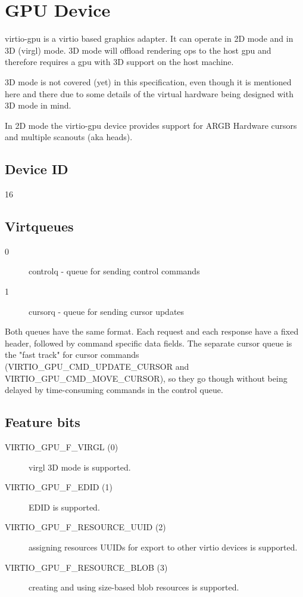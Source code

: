 \section{GPU Device}\label{sec:Device Types / GPU Device}

virtio-gpu is a virtio based graphics adapter.  It can operate in 2D
mode and in 3D (virgl) mode.  3D mode will offload rendering ops to
the host gpu and therefore requires a gpu with 3D support on the host
machine.

3D mode is not covered (yet) in this specification, even though it is
mentioned here and there due to some details of the virtual hardware
being designed with 3D mode in mind.

In 2D mode the virtio-gpu device provides support for ARGB Hardware
cursors and multiple scanouts (aka heads).

\subsection{Device ID}\label{sec:Device Types / GPU Device / Device ID}

16

\subsection{Virtqueues}\label{sec:Device Types / GPU Device / Virtqueues}

\begin{description}
\item[0] controlq - queue for sending control commands
\item[1] cursorq - queue for sending cursor updates
\end{description}

Both queues have the same format.  Each request and each response have
a fixed header, followed by command specific data fields.  The
separate cursor queue is the "fast track" for cursor commands
(VIRTIO_GPU_CMD_UPDATE_CURSOR and VIRTIO_GPU_CMD_MOVE_CURSOR), so they
go though without being delayed by time-consuming commands in the
control queue.

\subsection{Feature bits}\label{sec:Device Types / GPU Device / Feature bits}

\begin{description}
\item[VIRTIO_GPU_F_VIRGL (0)] virgl 3D mode is supported.
\item[VIRTIO_GPU_F_EDID  (1)] EDID is supported.
\item[VIRTIO_GPU_F_RESOURCE_UUID (2)] assigning resources UUIDs for export
  to other virtio devices is supported.
\item[VIRTIO_GPU_F_RESOURCE_BLOB (3)] creating and using size-based blob
  resources is supported.
\end{description}

